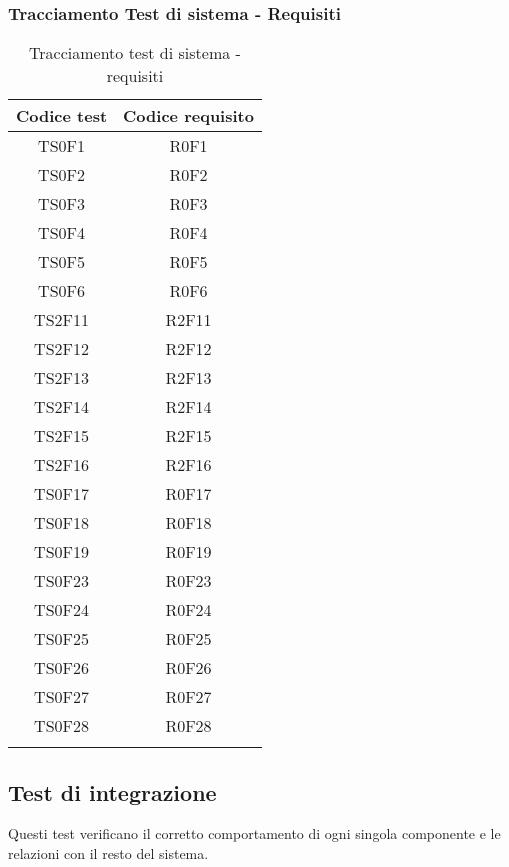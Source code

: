 \subsubsection{Tracciamento Test di sistema - Requisiti}
\normalsize
\begin{longtable}{|c|c|}
	\hline
	\textbf{Codice test} & \textbf{Codice requisito} \\
	\hline
	\endhead
	TS0F1 & R0F1\\
	\hline
	TS0F2 & R0F2\\
	\hline
	TS0F3 & R0F3\\
	\hline
	TS0F4 & R0F4\\
	\hline
	TS0F5 & R0F5\\
	\hline
	TS0F6 & R0F6\\
	\hline
	TS2F11 & R2F11\\
	\hline
	TS2F12 & R2F12\\
	\hline
	TS2F13 & R2F13\\
	\hline
	TS2F14 & R2F14\\
	\hline
	TS2F15 & R2F15\\
	\hline
	TS2F16 & R2F16\\
	\hline
	TS0F17 & R0F17\\
	\hline
	TS0F18 & R0F18\\
	\hline
	TS0F19 & R0F19\\
	\hline
	TS0F23 & R0F23\\
	\hline
	TS0F24 & R0F24\\
	\hline
	TS0F25 & R0F25\\
	\hline
	TS0F26 & R0F26\\
	\hline
	TS0F27 & R0F27\\
	\hline
	TS0F28 & R0F28\\
	\hline
	\caption[Tracciamento test di sistema - requisiti]{Tracciamento test di sistema - requisiti}
\end{longtable}
\clearpage

\subsection{Test di integrazione}
Questi test verificano il corretto comportamento di ogni singola componente e le relazioni con il resto del sistema.

